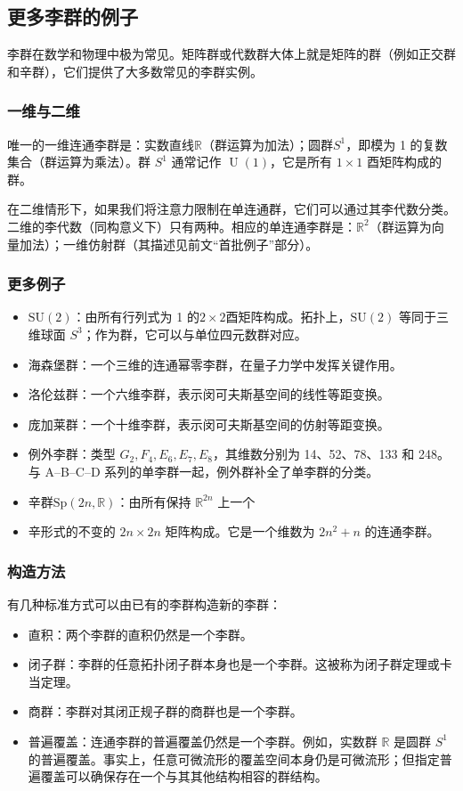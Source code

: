 \subsection{更多李群的例子}
李群在数学和物理中极为常见。矩阵群或代数群大体上就是矩阵的群（例如正交群和辛群），它们提供了大多数常见的李群实例。
\subsubsection{一维与二维}
唯一的一维连通李群是：实数直线$\mathbb{R}$（群运算为加法）；圆群$S^{1}$，即模为 1 的复数集合（群运算为乘法）。群 $S^{1}$ 通常记作 $\operatorname{U}(1)$，它是所有 $1 \times 1$ 酉矩阵构成的群。

在二维情形下，如果我们将注意力限制在单连通群，它们可以通过其李代数分类。二维的李代数（同构意义下）只有两种。相应的单连通李群是：$\mathbb{R}^{2}$（群运算为向量加法）；一维仿射群（其描述见前文“首批例子”部分）。
\subsubsection{更多例子}
\begin{itemize}
\item $\mathrm{SU}(2)$：由所有行列式为 1 的$2 \times 2$酉矩阵构成。拓扑上，$\mathrm{SU}(2)$ 等同于三维球面 $S^{3}$；作为群，它可以与单位四元数群对应。
\item 海森堡群：一个三维的连通幂零李群，在量子力学中发挥关键作用。
\item 洛伦兹群：一个六维李群，表示闵可夫斯基空间的线性等距变换。
\item 庞加莱群：一个十维李群，表示闵可夫斯基空间的仿射等距变换。
\item 例外李群：类型 $G_{2}, F_{4}, E_{6}, E_{7}, E_{8}$，其维数分别为 14、52、78、133 和 248。与 A–B–C–D 系列的单李群一起，例外群补全了单李群的分类。
\item 辛群$\mathrm{Sp}(2n,\mathbb{R})$：由所有保持 $\mathbb{R}^{2n}$ 上一个\item 辛形式的不变的 $2n \times 2n$ 矩阵构成。它是一个维数为 $2n^{2}+n$ 的连通李群。
\end{itemize}
\subsubsection{构造方法}
有几种标准方式可以由已有的李群构造新的李群：
\begin{itemize}
\item 直积：两个李群的直积仍然是一个李群。
\item 闭子群：李群的任意拓扑闭子群本身也是一个李群。这被称为闭子群定理或卡当定理。
\item 商群：李群对其闭正规子群的商群也是一个李群。
\item 普遍覆盖：连通李群的普遍覆盖仍然是一个李群。例如，实数群 $\mathbb{R}$ 是圆群 $S^{1}$ 的普遍覆盖。事实上，任意可微流形的覆盖空间本身仍是可微流形；但指定普遍覆盖可以确保存在一个与其其他结构相容的群结构。
\end{itemize}

